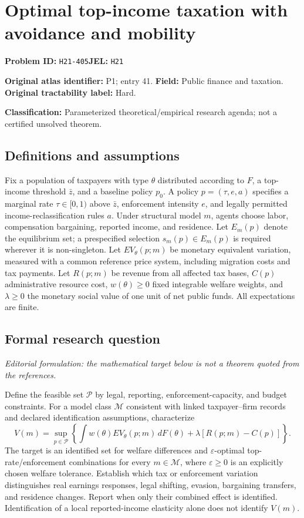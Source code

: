 \documentclass[11pt,a4paper]{article}
\begin{document}
\section*{Optimal top-income taxation with avoidance and mobility}
\textbf{Problem ID:} \texttt{H21-405}\quad \textbf{JEL:} \texttt{H21}\par
\label{problem:OP-0041}
\label{atlas:prob:P1}
\noindent\textbf{Original atlas identifier:} P1; entry 41. \textbf{Field:} Public finance and taxation. \textbf{Original tractability label:} Hard.

\noindent\textbf{Classification:} Parameterized theoretical/empirical research agenda; not a certified unsolved theorem.

\subsection*{Definitions and assumptions}
Fix a population of taxpayers with type $\theta$ distributed according to $F$, a top-income threshold $\bar z$, and a baseline policy $p_0$. A policy $p=(\tau,e,a)$ specifies a marginal rate $\tau\in[0,1)$ above $\bar z$, enforcement intensity $e$, and legally permitted income-reclassification rules $a$. Under structural model $m$, agents choose labor, compensation bargaining, reported income, and residence. Let $E_m(p)$ denote the equilibrium set; a prespecified selection $s_m(p)\in E_m(p)$ is required wherever it is non-singleton. Let $EV_\theta(p;m)$ be monetary equivalent variation, measured with a common reference price system, including migration costs and tax payments. Let $R(p;m)$ be revenue from all affected tax bases, $C(p)$ administrative resource cost, $w(\theta)\geq0$ fixed integrable welfare weights, and $\lambda\geq0$ the monetary social value of one unit of net public funds. All expectations are finite.

\subsection*{Formal research question}
\emph{Editorial formulation: the mathematical target below is not a theorem quoted from the references.}

Define the feasible set $\mathcal P$ by legal, reporting, enforcement-capacity, and budget constraints. For a model class $\mathcal M$ consistent with linked taxpayer--firm records and declared identification assumptions, characterize
\[
 V(m)=\sup_{p\in\mathcal P}\left\{\int w(\theta)EV_\theta(p;m)\,dF(\theta)+\lambda[R(p;m)-C(p)]\right\}.
\]
The target is an identified set for welfare differences and $\varepsilon$-optimal top-rate/enforcement combinations for every $m\in\mathcal M$, where $\varepsilon\geq0$ is an explicitly chosen welfare tolerance. Establish which tax or enforcement variation distinguishes real earnings responses, legal shifting, evasion, bargaining transfers, and residence changes. Report when only their combined effect is identified. Identification of a local reported-income elasticity alone does not identify $V(m)$.
\end{document}
